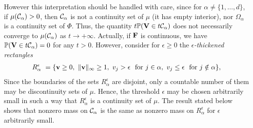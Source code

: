  However this interpretation should be handled with care,
since  for $\alpha\neq\{ 1,\ldots,d\}$,  if $\mu(\mathcal{C}_\alpha)>0$,
then $\mathcal{C}_\alpha$  is not a continuity set of $\mu$
(it has empty interior), nor $\Omega_\alpha$ is a continuity set
of $\Phi$. Thus, the quantity $t \mathbb{P}(\mathbf V \in t \mathcal{C}_\alpha)$ does not necessarily converge to
$\mu(\mathcal{C}_\alpha)$ as $t\rightarrow +\infty$. 
Actually, if $\mathbf F$ is continuous, we have $\mathbb{P}(\mathbf V \in t \mathcal{C}_\alpha) =0$
for any $t>0$. However, consider for $\epsilon \ge 0$ the {\it $\epsilon$-thickened rectangles }
\begin{align}
 \label{jmva:eq:epsilon_Rectangle} %
 R_\alpha^\epsilon~=\{\mb v \ge 0,~\|\mb v\|_\infty \ge 1,~ v_j > \epsilon  ~\text{ for } j \in \alpha,
~v_j \le \epsilon ~\text{ for } j \notin \alpha
 \} ,
\end{align}
Since the boundaries of the sets $R_\alpha^\epsilon$ are disjoint, only a countable number of them may be discontinuity sets of $\mu$. Hence, the threshold $\epsilon$ may be chosen arbitrarily small  in such a way that
$R_\alpha^\epsilon$ is a continuity set of $\mu$. 
The result stated below
shows that nonzero mass on $\mathcal{C}_\alpha$ is the same as
nonzero mass on $R_\alpha^\epsilon$  for $\epsilon$ arbitrarily small.

